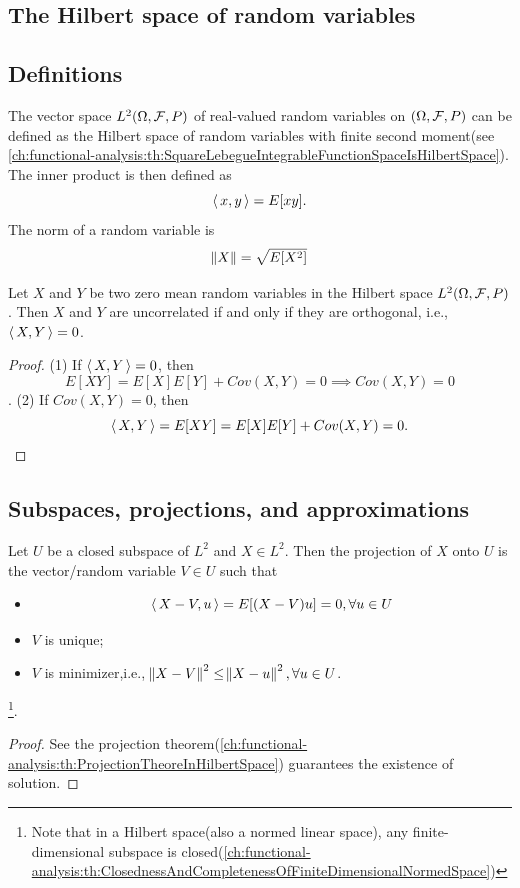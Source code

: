 \begin{refsection}
\section{The Hilbert space of random variables}
\subsection{Definitions}
\begin{definition}
The vector space $L^2(\Omega,\mathcal{F},P)$ of real-valued random variables on $(\Omega,\mathcal{F},P)$ can be defined as the Hilbert space of random variables with finite second moment(see \autoref{ch:functional-analysis:th:SquareLebegueIntegrableFunctionSpaceIsHilbertSpace}). The inner product is then defined as 
$${\left< \, x,y \, \right>} = E[xy].$$
The norm of a random variable is 
$$\norm{X} = \sqrt{E[X^2]}$$
\end{definition}

\begin{lemma}
Let $X$ and $Y$ be two zero mean random variables in the Hilbert space $L^2(\Omega,\mathcal{F},P)$. Then $X$ and $Y$ are uncorrelated if and only if they are orthogonal, i.e., ${\left< \, X,Y \, \right>} = 0$.
\end{lemma}
\begin{proof}
(1) If ${\left< \, X,Y \, \right>} = 0$, then $$E[XY] = E[X]E[Y] + Cov(X,Y) = 0 \implies Cov(X,Y) = 0$$.	
(2) If $Cov(X,Y) = 0$, then $${\left< \, X,Y \, \right>} = E[XY] =  E[X]E[Y] + Cov(X,Y) = 0.$$
\end{proof}





\subsection{Subspaces, projections, and approximations}



\begin{theorem}
Let $U$ be a closed subspace of $L^2$ and $X\in L^2$. Then the projection of $X$ onto $U$ is the vector/random variable $V\in U$ such that
\begin{itemize}
	\item $${\left< \, X-V,u \, \right>}=E[(X-V)u] = 0, \forall u\in U$$
    \item $V$ is unique;
    \item $V$ is minimizer,i.e., $\norm{X-V}^2 \leq \norm{X-u}^2, \forall u\in U$.
\end{itemize}
\footnote{Note that in a Hilbert space(also a normed linear space), any finite-dimensional subspace is closed(\autoref{ch:functional-analysis:th:ClosednessAndCompletenessOfFiniteDimensionalNormedSpace})}.
\end{theorem}
\begin{proof}
	See the projection theorem(\autoref{ch:functional-analysis:th:ProjectionTheoreInHilbertSpace}) guarantees the existence of solution.	
\end{proof}


\end{refsection}
